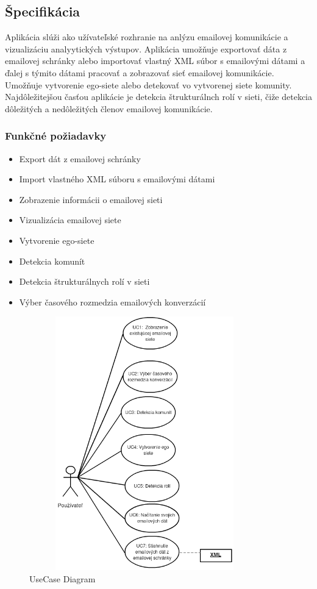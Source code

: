 \documentclass[slovak,master,public,dept460,male,cpdeclaration,oneside]{diploma}
\begin{document}
\subsection{Špecifikácia}
Aplikácia slúži ako užívateľské rozhranie na anlýzu emailovej komunikácie a vizualizáciu analyytických výstupov. Aplikácia umožňuje exportovať dáta z emailovej schránky alebo importovať vlastný XML súbor s emailovými dátami a ďalej s týmito dátami pracovať a zobrazovať sieť emailovej komunikácie. Umožňuje vytvorenie ego-siete alebo detekovať vo vytvorenej siete komunity. Najdôležitejšou časťou aplikácie je detekcia štrukturálnch rolí v sieti, čiže detekcia dôležitých a nedôležitých členov emailovej komunikácie. 


\subsubsection{Funkčné požiadavky}
\begin{itemize}
\item Export dát z emailovej schránky
\item Import vlastného XML súboru s emailovými dátami
\item Zobrazenie informácii o emailovej sieti
\item Vizualizácia emailovej siete
\item Vytvorenie ego-siete
\item Detekcia komunít
\item Detekcia štrukturálnych rolí v sieti
\item Výber časového rozmedzia emailových konverzácií
\end{itemize}


\begin{figure}[H]
\centering
\includegraphics[width=10cm, height=11cm]{figures/diagram_usecase}
\caption{UseCase Diagram}
\end{figure}
\end{document}
